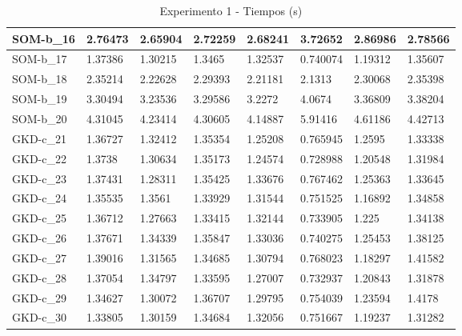 \documentclass[11pt,a4paper]{article}
\begin{document}
\begin{table}[H]
\begin{tabular}{l|l|l|l|l|l|l|l|}
			\multicolumn{1}{|l|}{SOM-b\_16} & 2.76473  & 2.65904  & 2.72259  & 2.68241  & 3.72652  & 2.86986  & 2.78566  \\ \hline
			\multicolumn{1}{|l|}{SOM-b\_17} & 1.37386  & 1.30215  & 1.3465   & 1.32537  & 0.740074 & 1.19312  & 1.35607  \\ \hline
			\multicolumn{1}{|l|}{SOM-b\_18} & 2.35214  & 2.22628  & 2.29393  & 2.21181  & 2.1313   & 2.30068  & 2.35398  \\ \hline
			\multicolumn{1}{|l|}{SOM-b\_19} & 3.30494  & 3.23536  & 3.29586  & 3.2272   & 4.0674   & 3.36809  & 3.38204  \\ \hline
			\multicolumn{1}{|l|}{SOM-b\_20} & 4.31045  & 4.23414  & 4.30605  & 4.14887  & 5.91416  & 4.61186  & 4.42713  \\ \hline
			\multicolumn{1}{|l|}{GKD-c\_21} & 1.36727  & 1.32412  & 1.35354  & 1.25208  & 0.765945 & 1.2595   & 1.33338  \\ \hline
			\multicolumn{1}{|l|}{GKD-c\_22} & 1.3738   & 1.30634  & 1.35173  & 1.24574  & 0.728988 & 1.20548  & 1.31984  \\ \hline
			\multicolumn{1}{|l|}{GKD-c\_23} & 1.37431  & 1.28311  & 1.35425  & 1.33676  & 0.767462 & 1.25363  & 1.33645  \\ \hline
			\multicolumn{1}{|l|}{GKD-c\_24} & 1.35535  & 1.3561   & 1.33929  & 1.31544  & 0.751525 & 1.16892  & 1.34858  \\ \hline
			\multicolumn{1}{|l|}{GKD-c\_25} & 1.36712  & 1.27663  & 1.33415  & 1.32144  & 0.733905 & 1.225    & 1.34138  \\ \hline
			\multicolumn{1}{|l|}{GKD-c\_26} & 1.37671  & 1.34339  & 1.35847  & 1.33036  & 0.740275 & 1.25453  & 1.38125  \\ \hline
			\multicolumn{1}{|l|}{GKD-c\_27} & 1.39016  & 1.31565  & 1.34685  & 1.30794  & 0.768023 & 1.18297  & 1.41582  \\ \hline
			\multicolumn{1}{|l|}{GKD-c\_28} & 1.37054  & 1.34797  & 1.33595  & 1.27007  & 0.732937 & 1.20843  & 1.31878  \\ \hline
			\multicolumn{1}{|l|}{GKD-c\_29} & 1.34627  & 1.30072  & 1.36707  & 1.29795  & 0.754039 & 1.23594  & 1.4178   \\ \hline
			\multicolumn{1}{|l|}{GKD-c\_30} & 1.33805  & 1.30159  & 1.34684  & 1.32056  & 0.751667 & 1.19237  & 1.31282  \\ \hline
		\end{tabular}
		\caption{ Experimento 1 - Tiempos (s) }
		\label{212}
	\end{table}
\end{document}
